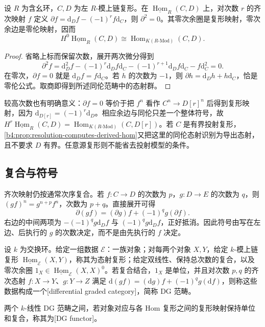 \begin{proposition}\label{b4:prop:dg-hom-complex}
	设 \(R\) 为含幺环，\(C,D\) 为左 \(R\)-模上链复形。在 \(\underline{\operatorname{Hom}}_R(C,D)\) 上，对次数 \(r\) 的齐次映射 \(f\) 定义 \(\partial f=\mathrm d_Df-(-1)^rf\mathrm d_C\)，则 \(\partial^2=0\)。其零次余圈是复形映射，零次余边是零伦映射，因而
	\[
		H^0\underline{\operatorname{Hom}}_R(C,D) \cong\operatorname{Hom}_{K(R\text{-}\mathrm{Mod})}(C,D).
	\]
\end{proposition}
\begin{proof}
	省略上标而保留次数，展开两次微分得到
	\[
		\partial^2 f=\mathrm{d}_D^2f-(-1)^r \mathrm{d}_Df\mathrm{d}_C -(-1)^{r+1}\mathrm{d}_Df\mathrm{d}_C-f\mathrm{d}_C^2=0.
	\]
	在零次，\(\partial f=0\) 就是 \(\mathrm{d}_Df=f\mathrm{d}_C\)。若 \(h\) 的次数为 \(-1\)，则 \(\partial h=\mathrm{d}_Dh+h\mathrm{d}_C\)，恰是零伦公式。取商即得到所述同伦范畴中的态射群。
\end{proof}

较高次数也有明确意义：\(\partial f=0\) 等价于把 \(f^n\) 看作 \(C^n\to D[r]^n\) 后得到复形映射，因为 \(\mathrm{d}_{D[r]}=(-1)^r \mathrm{d}_D\)。相应余边与同伦只差一个整体符号，故 \(H^r\underline{\operatorname{Hom}}_R(C,D)=\operatorname{Hom}_{K(R\text{-}\mathrm{Mod})}(C,D[r])\)。若 \(C\) 是有界投射复形，\cref{b4:prop:resolution-computes-derived-hom}又把这里的同伦态射识别为导出态射，且不要求 \(D\) 有界。任意源复形则不能省去投射模型的条件。

\subsection{复合与符号}
\label{b4:subsec:2001:03}

齐次映射仍按通常次序复合。若 \(f:C\to D\) 的次数为 \(p\)，\(g:D\to E\) 的次数为 \(q\)，则 \((gf)^n=g^{n+p}f^n\)，次数为 \(p+q\)。直接展开可得
\begin{equation}\label{b4:eq:dg-composition-leibniz}
	\partial(gf)=(\partial g)f+(-1)^q g(\partial f).
\end{equation}
右边的中间两项为 \(-(-1)^q g\mathrm{d}_Df\) 与 \(( -1)^q g\mathrm{d}_Df\)，正好抵消。因此符号由写在左边、后执行的 \(g\) 的次数决定，而不是由先执行的 \(f\) 决定。

\begin{definition}\label{b4:def:dg-category}
	设 \(k\) 为交换环。给定一组数据 \(\mathcal E\)：一族对象；对每两个对象 \(X,Y\)，给定 \(k\)-模上链复形 \(\underline{\operatorname{Hom}}_{\mathcal E}(X,Y)\)，称其为态射复形；给定双线性、保持总次数的复合，以及零次余圈 \(1_X\in\underline{\operatorname{Hom}}_{\mathcal E}(X,X)^0\)。若复合结合，\(1_X\) 是单位，并且对次数 \(p,q\) 的齐次态射 \(f:X\to Y\)、\(g:Y\to Z\) 满足 \(\mathrm d(gf)=(\mathrm dg)f+(-1)^qg(\mathrm df)\)，则称这些数据构成一个[differential graded category]，简称 DG 范畴。

	两个 \(k\)-线性 DG 范畴之间，若对象对应与各 Hom 复形之间的复形映射保持单位和复合，称其为[DG functor]。
\end{definition}

